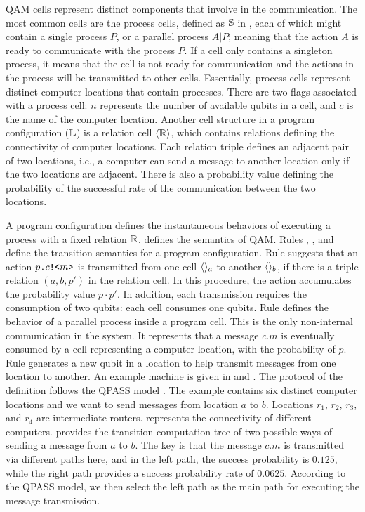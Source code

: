 QAM cells represent distinct components that involve in the communication. The most common cells are the process cells, 
defined as $\mathbb{S}$ in , each of which might contain a single process $P$, 
or a parallel process $A\texttt{|}P$; 
meaning that the action $A$ is ready to communicate with the process $P$.
If a cell only contains a singleton process,
it means that the cell is not ready for communication and the actions in the process will be transmitted to other cells.
Essentially, process cells represent distinct computer locations that contain processes.
There are two flags associated with a process cell: $n$ represents the number of available qubits in a cell, 
and $c$ is the name of the computer location.
Another cell structure in a program configuration ($\mathbb{L}$) is a relation cell $\langle \mathbb{R} \rangle$,
which contains relations defining the connectivity of computer locations.
Each relation triple defines an adjacent pair of two locations, i.e., 
a computer can send a message to another location only if the two locations are adjacent.
There is also a probability value defining the probability of the successful rate of the communication between the two locations.

A program configuration defines the instantaneous behaviors of executing a process with a fixed relation $\mathbb{R}$.
 defines the semantics of QAM.
Rules , , and  define the transition semantics for a program configuration.
Rule  suggests that an action $p\texttt{.}c\texttt{!<}m\texttt{>}$ is transmitted from one cell $\langle  \rangle_a$ to another $\langle  \rangle_b$,
if there is a triple relation $(a,b,p')$ in the relation cell. 
In this procedure, the action accumulates the probability value $p\cdot p'$.
In addition, each transmission requires the consumption of two qubits: each cell consumes one qubits.
Rule  defines the behavior of a parallel process inside a program cell.
This is the only non-internal communication in the system. It represents that a message $c.m$
is eventually consumed by a cell representing a computer location, with the probability of $p$.
Rule  generates a new qubit in a location to help transmit messages from one location to another.
An example machine is given in  and .
The protocol of the definition follows the QPASS model \cite{10.1145/3387514.3405853}. 
The example contains six distinct computer locations and we want to send messages from location $a$ to $b$.
Locations $r_1$, $r_2$, $r_3$, and $r_4$ are intermediate routers. 
 represents the connectivity of different computers. 
 provides the transition computation tree of two possible ways of sending a message from $a$ to $b$.
The key is that the message $c.m$ is transmitted via different paths here, 
and in the left path, the success probability is $0.125$, while the right path provides a success probability rate of $0.0625$.
According to the QPASS model, we then select the left path as the main path for executing the message transmission.

